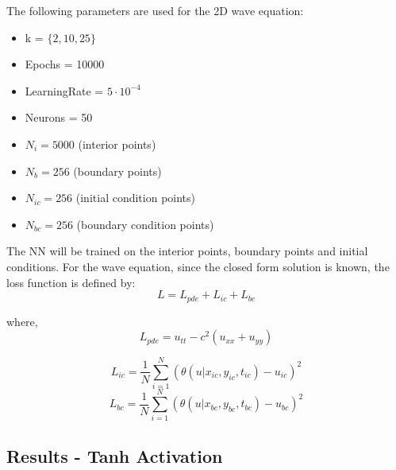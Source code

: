 \documentclass[11pt]{article}
\begin{document}
The following parameters are used for the 2D wave equation:
\begin{itemize}
    \item k = $\lbrace 2, 10, 25 \rbrace$
    \item Epochs = 10000
    \item LearningRate = $5 \cdot 10^{-4}$
    \item Neurons = 50
    \item $N_{i}  = 5000$ (interior points)
    \item $N_{b}  = 256$  (boundary points)
    \item $N_{ic} = 256$  (initial condition points)
    \item $N_{bc} = 256$  (boundary condition points)
\end{itemize}

The NN will be trained on the interior points, boundary points and initial conditions. For the wave equation, since the closed form solution is known, the loss function is defined by:
\begin{equation}
    L = L_{pde} + L_{ic} + L_{bc}
\end{equation}

where,
\begin{equation}
    L_{pde} = u_{tt} - c^2 (u_{xx} + u_{yy})
\end{equation}

\begin{equation}
    L_{ic} = \frac{1}{N} \sum_{i=1}^{N} (\theta(u|x_{ic}, y_{ic}, t_{ic})-u_{ic})^2
\end{equation}
\begin{equation}
    L_{bc} = \frac{1}{N} \sum_{i=1}^{N} (\theta(u|x_{bc}, y_{bc}, t_{bc})-u_{bc})^2
\end{equation}

\pagebreak
\subsection{Results - Tanh Activation}
\end{document}
